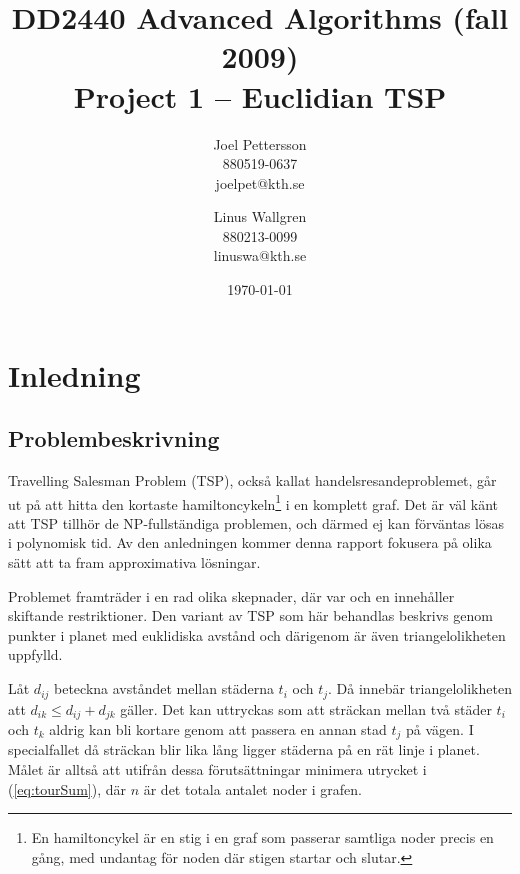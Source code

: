 \documentclass[a4paper,12pt]{article}
\renewcommand{\*}{\ensuremath{\cdot}}
\begin{document}
\title{DD2440 Advanced Algorithms (fall 2009) \\ Project 1 -- Euclidian TSP}
\author{Joel Pettersson \\ 880519-0637 \\ joelpet@kth.se \and Linus Wallgren \\
880213-0099  \\ linuswa@kth.se}
\date{\today}
\maketitle
\thispagestyle{empty}
\newpage
\setcounter{page}{1}


\section{Inledning}


\subsection{Problembeskrivning} 

Travelling Salesman Problem (TSP), också kallat handelsresandeproblemet, går ut
på att hitta den kortaste hamiltoncykeln\footnote{En hamiltoncykel är en stig i
en graf som passerar samtliga noder precis en gång, med undantag för noden där
stigen startar och slutar.} i en komplett graf. Det är väl känt att TSP tillhör
de NP-fullständiga problemen, och därmed ej kan förväntas lösas i polynomisk
tid. Av den anledningen kommer denna rapport fokusera på olika sätt att ta fram
approximativa lösningar.

Problemet framträder i en rad olika skepnader, där var och en innehåller
skiftande restriktioner. Den variant av TSP som här behandlas beskrivs genom
punkter i planet med euklidiska avstånd och därigenom är även triangelolikheten
uppfylld.

Låt $d_{ij}$ beteckna avståndet mellan städerna $t_i$ och $t_j$. Då innebär
triangelolikheten att $d_{ik} \leq d_{ij} + d_{jk}$ gäller. Det kan uttryckas
som att sträckan mellan två städer $t_i$ och $t_k$ aldrig kan bli kortare genom
att passera en annan stad $t_j$ på vägen. I specialfallet då sträckan blir lika
lång ligger städerna på en rät linje i planet. Målet är alltså att utifrån dessa
förutsättningar minimera utrycket i (\ref{eq:tourSum}), där $n$ är det totala
antalet noder i grafen.
\end{document}
